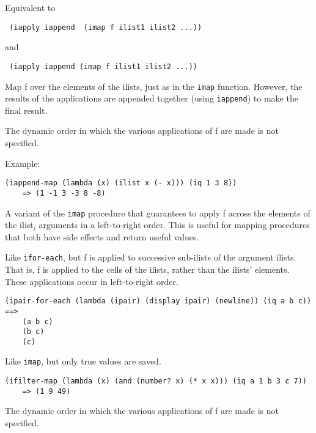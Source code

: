\begin{entry}{%
  }

Equivalent to

  \texttt{\ (iapply\ iappend\ \ (imap\ f\ ilist1\ ilist2\ ...))}

  and

  \texttt{\ (iapply\ iappend\ (imap\ f\ ilist1\ ilist2\ ...))}

  Map f over the elements of the ilists, just as in the \texttt{imap}
  function. However, the results of the applications are appended
  together (using \texttt{iappend}) to make the final result.

  The dynamic order in which the various applications of f are made is
  not specified.

  Example:

\begin{verbatim}
(iappend-map (lambda (x) (ilist x (- x))) (iq 1 3 8))
    => (1 -1 3 -3 8 -8)
\end{verbatim}
\end{entry}

\begin{entry}{%
  }

  A variant of the \texttt{imap} procedure
  that guarantees to apply f across the elements of the ilist$_i$
  arguments in a left-to-right order. This is useful for mapping
  procedures that both have side effects and return useful values.
\end{entry}

\begin{entry}{%
  }

  Like \texttt{ifor-each}, but f is
  applied to successive sub-ilists of the argument ilists. That is, f
  is applied to the cells of the ilists, rather than the ilists'
  elements. These applications occur in left-to-right order.

\begin{verbatim}
(ipair-for-each (lambda (ipair) (display ipair) (newline)) (iq a b c)) ==>
    (a b c)
    (b c)
    (c)
\end{verbatim}
\end{entry}

\begin{entry}{%
  }

  Like \texttt{imap}, but only true values are saved.

\begin{verbatim}
(ifilter-map (lambda (x) (and (number? x) (* x x))) (iq a 1 b 3 c 7))
    => (1 9 49)
\end{verbatim}

  The dynamic order in which the various applications of f are made is
  not specified.
\end{entry}

